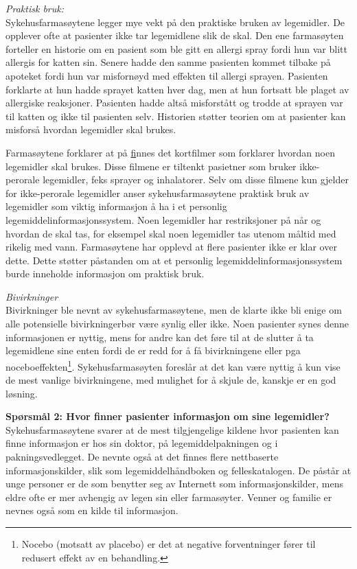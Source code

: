 \textit{Praktisk bruk:} \\
Sykehusfarmasøytene legger mye vekt på den praktiske bruken av legemidler. De opplever ofte at pasienter ikke tar legemidlene slik de skal. Den ene farmasøyten forteller en historie om en pasient som ble gitt en allergi spray fordi hun var blitt allergis for katten sin. Senere hadde den samme pasienten kommet tilbake på apoteket fordi hun var misfornøyd med effekten til allergi sprayen. Pasienten forklarte at hun hadde sprayet katten hver dag, men at hun fortsatt ble plaget av allergiske reaksjoner. Pasienten hadde altså misforstått og trodde at sprayen var til katten og ikke til pasienten selv. Historien støtter teorien om at pasienter kan misforså hvordan legemidler skal brukes. 

Farmasøytene forklarer at på \href{www.felleskatalogen.no} finnes det kortfilmer som forklarer hvordan noen legemidler skal brukes. Disse filmene er tiltenkt pasietner som bruker ikke-perorale legemidler, feks sprayer og inhalatorer. Selv om disse filmene kun gjelder for ikke-perorale legemidler anser sykehusfarmasøytene praktisk bruk av legemidler som viktig informasjon å ha i et personlig legemiddelinformasjonssystem. Noen legemidler har restriksjoner på når og hvordan de skal tas, for eksempel skal noen legemidler tas utenom måltid med rikelig med vann. Farmasøytene har opplevd at flere pasienter ikke er klar over dette. Dette støtter påstanden om at et personlig legemiddelinformasjonssystem burde inneholde informasjon om praktisk bruk.

\textit{Bivirkninger} \\
Bivirkninger ble nevnt av sykehusfarmasøytene, men de klarte ikke bli enige om alle potensielle bivirkningerbør være synlig  eller ikke. Noen pasienter synes denne informasjonen er nyttig, mens for andre kan det føre til at de slutter å ta legemidlene sine enten fordi de er redd for å få bivirkningene eller pga noceboeffekten\footnote{Nocebo (motsatt av placebo) er det at negative forventninger fører til redusert effekt av en behandling.}. Sykehusfarmasøyten foreslår at det kan være nyttig å kun vise de mest vanlige bivirkningene, med mulighet for å skjule de, kanskje er en god løsning. 

\textbf{Spørsmål 2: Hvor finner pasienter informasjon om sine legemidler?} \\
Sykehusfarmasøytene svarer at de mest tilgjengelige kildene hvor pasienten kan finne informasjon er hos sin doktor, på legemiddelpakningen og i pakningsvedlegget. De nevnte også at det finnes flere nettbaserte informasjonskilder, slik som legemiddelhåndboken og felleskatalogen. De påstår at unge personer er de som benytter seg av Internett som informasjonskilder, mens eldre ofte er mer avhengig av legen sin eller farmasøyter. Venner og familie er nevnes også som en kilde til informasjon.

